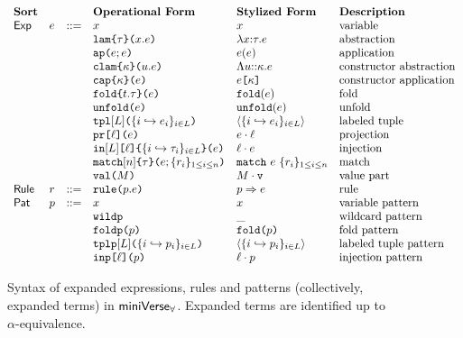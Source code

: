 \begin{figure}[p] 
$\begin{array}{lllllll}
\textbf{Sort} & & & \textbf{Operational Form} & \textbf{Stylized Form} & \textbf{Description}\\
\mathsf{Exp} & e & ::= & x & x & \text{variable}\\
&&& \texttt{lam}\texttt{\{}\tau\texttt{\}(}x.e\texttt{)} & \lambda x{:}\tau.e & \text{abstraction}\\
&&& \texttt{ap}\texttt{(}e; e\texttt{)} & e(e) & \text{application}\\
&&& \texttt{clam}\texttt{\{}\kappa\texttt{\}(}u.e\texttt{)} & \Lambda u{::}\kappa.e & \text{constructor abstraction}\\
&&& \texttt{cap}\texttt{\{}\kappa\texttt{\}(}e\texttt{)} & e\texttt{[}\kappa\texttt{]} & \text{constructor application}\\
&&& \texttt{fold}\texttt{\{}t.\tau\texttt{\}(}e\texttt{)} & \texttt{fold}(e) & \text{fold}\\
&&& \texttt{unfold}\texttt{(}e\texttt{)} & \texttt{unfold}(e) & \text{unfold}\\
&&& \texttt{tpl}[L]\texttt{(}\{i \hookrightarrow e_{i}\}_{i \in L}\texttt{)} & \langle \{i \hookrightarrow e_{i}\}_{i \in L}\rangle & \text{labeled tuple}\\
&&& \texttt{pr}\texttt{[}\ell\texttt{](}e\texttt{)} & e \cdot \ell & \text{projection}\\
&&& \texttt{in}[L]\texttt{[}\ell\texttt{]\{}\{i \hookrightarrow \tau_{i}\}_{i \in L}\texttt{\}(}e\texttt{)} & \ell \cdot e & \text{injection}\\
&&& \texttt{match}[n]\texttt{\{}\tau\texttt{\}(}e; \{r_{i}\}_{1 \leq i \leq n}\texttt{)} & \texttt{match}~e~\{r_{i}\}_{1 \leq i \leq n} & \text{match}\\
&&& \texttt{val}\texttt{(}M\texttt{)} & M \cdot \texttt{v} & \text{value part}\\
\mathsf{Rule} & r & ::= & \texttt{rule}\texttt{(}p.e\texttt{)} & p \Rightarrow e & \text{rule}\\
\mathsf{Pat} & p & ::= & x & x & \text{variable pattern}\\
&&& \texttt{wildp} & \_ & \text{wildcard pattern}\\
&&& \texttt{foldp}\texttt{(}p\texttt{)} & \texttt{fold}\texttt{(}p\texttt{)} & \text{fold pattern}\\
&&& \texttt{tplp}[L]\texttt{(}\{i \hookrightarrow p_{i}\}_{i \in L}\texttt{)} & \langle \{i \hookrightarrow p_{i}\}_{i \in L} \rangle & \text{labeled tuple pattern}\\
&&& \texttt{inp}\texttt{[}\ell\texttt{](}p\texttt{)} & \ell \cdot p & \text{injection pattern}
\end{array}$
\caption[Syntax of expanded expressions, rules and patterns in $\miniVerseParam$]{Syntax of expanded expressions, rules and patterns (collectively, expanded terms) in $\miniVerseParam$. Expanded terms are identified up to $\alpha$-equivalence.}
\label{fig:P-expanded-terms}
\end{figure}

